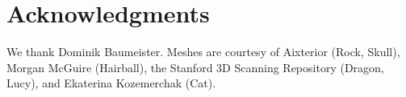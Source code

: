 \section*{Acknowledgments}
{We thank Dominik Baumeister.}
{}
Meshes are courtesy of Aixterior (Rock, Skull), Morgan McGuire (Hairball), the Stanford 3D Scanning Repository (Dragon, Lucy), and Ekaterina Kozemerchak (Cat).
